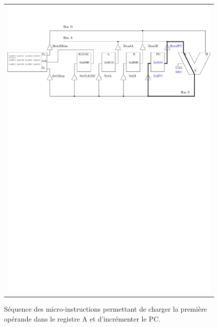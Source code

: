 \begin{figure}[htbp]
\begin{tabular}{c}
\includegraphics[width=\linewidth]{Figs/premier_chemin_lda_3.pdf}
\end{tabular}
\caption{\label{fig:premier_chemin_lda} Séquence des micro-instructions permettant de charger la première opérande dans le registre A et d'incrémenter le PC.}
\end{figure}

